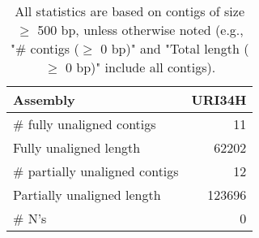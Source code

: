 \documentclass[12pt,a4paper]{article}
\begin{document}
\begin{table}[ht]
\begin{center}
\caption{All statistics are based on contigs of size $\geq$ 500 bp, unless otherwise noted (e.g., "\# contigs ($\geq$ 0 bp)" and "Total length ($\geq$ 0 bp)" include all contigs).}
\begin{tabular}{|l*{1}{|r}|}
\hline
Assembly & URI34H \\ \hline
\# fully unaligned contigs & 11 \\ \hline
Fully unaligned length & 62202 \\ \hline
\# partially unaligned contigs & 12 \\ \hline
Partially unaligned length & 123696 \\ \hline
\# N's & 0 \\ \hline
\end{tabular}
\end{center}
\end{table}
\end{document}

